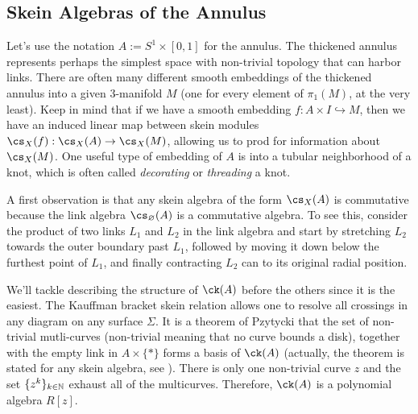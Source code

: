 
\subsection{Skein Algebras of the Annulus} \label{sub:annulus}

Let's use the notation $A := S^1 \times [0,1]$ for the annulus. The thickened annulus represents perhaps the simplest space with non-trivial topology that can harbor links. There are often many different smooth embeddings of the thickened annulus into a given 3-manifold $M$ (one for every element of $\pi_1(M)$, at the very least). Keep in mind that if we have a smooth embedding $f: A \times I \hookrightarrow M$, then we have an induced linear map between skein modules $\cs_X(f): \cs_X (A) \to \cs_X (M)$, allowing us to prod for information about $\cs_X(M)$. One useful type of embedding of $A$ is into a tubular neighborhood of a knot, which is often called \textit{decorating} or \textit{threading} a knot.

A first observation is that any skein algebra of the form $\cs_X(A)$ is commutative because the link algebra $\cs_\varnothing(A)$ is a commutative algebra. To see this, consider the product of two links $L_1$ and $L_2$ in the link algebra and start by stretching $L_2$ towards the outer boundary past $L_1$, followed by moving it down below the furthest point of $L_1$, and finally contracting $L_2$ can to its original radial position. 

We'll tackle describing the structure of $\ck(A)$ before the others since it is the easiest. The Kauffman bracket skein relation allows one to resolve all crossings in any diagram on any surface $\Sigma$. It is a theorem of Pzytycki that the set of non-trivial mutli-curves (non-trivial meaning that no curve bounds a disk), together with the empty link in $A \times \{ \ast \}$ forms a basis of $\ck(A)$ (actually, the theorem is stated for any skein algebra, see ). There is only one non-trivial curve $z$ and the set $\{ z^k \}_{k \in \mathbb{N}}$ exhaust all of the multicurves. Therefore, $\ck(A)$ is a polynomial algebra $R[z]$. 

